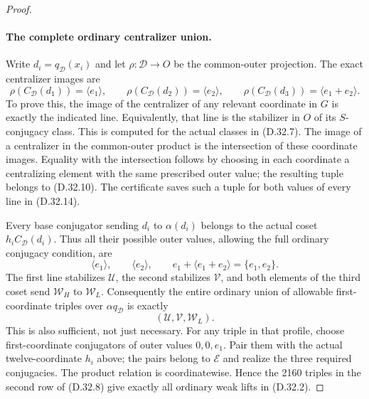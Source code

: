 \begin{proof}
\paragraph{The complete ordinary centralizer union.}
Write $d_i=q_{\mathcal D}(x_i)$
and let $\rho:\mathcal D\to O$
be the common-outer projection.
The exact centralizer images are
\[
 \rho(C_{\mathcal D}(d_1))=\langle e_1\rangle,\qquad
 \rho(C_{\mathcal D}(d_2))=\langle e_2\rangle,\qquad
 \rho(C_{\mathcal D}(d_3))=\langle e_1+e_2\rangle.
 \tag{D.32.14}
\]
To prove this, the image of
the centralizer of any relevant
coordinate in $G$ is exactly
the indicated line.  Equivalently,
that line is the stabilizer in
$O$ of its $S$-conjugacy class.
This is computed for the actual
classes in \textup{(D.32.7)}.
The image of a centralizer
in the common-outer product
is the intersection of these
coordinate images.  Equality
with the intersection follows
by choosing in each coordinate
a centralizing element with
the same prescribed outer value;
the resulting tuple belongs
to \textup{(D.32.10)}.
The certificate saves such
a tuple for both values of
every line in
\textup{(D.32.14)}.

Every base conjugator sending
$d_i$ to $\alpha(d_i)$ belongs
to the actual coset
$h_iC_{\mathcal D}(d_i)$.
Thus all their possible outer
values, allowing the full
ordinary conjugacy condition,
are
\[
 \langle e_1\rangle,\qquad
 \langle e_2\rangle,\qquad
 e_1+\langle e_1+e_2\rangle
                       =\{e_1,e_2\}.
 \tag{D.32.15}
\]
The first line stabilizes
$\mathcal U$, the second
stabilizes $\mathcal V$, and
both elements of the third
coset send $\mathcal W_H$
to $\mathcal W_L$.
Consequently the entire
ordinary union of allowable
first-coordinate triples over
$\alpha q_{\mathcal D}$ is
exactly
\[
                   (\mathcal U,\mathcal V,\mathcal W_L).
 \tag{D.32.16}
\]
This is also sufficient,
not just necessary.
For any triple in that profile,
choose first-coordinate
conjugators of outer values
$0,0,e_1$.  Pair them with
the actual twelve-coordinate
$h_i$ above; the pairs belong
to $\mathcal E$ and realize
the three required conjugacies.
The product relation is
coordinatewise.  Hence the
2160 triples in the second
row of \textup{(D.32.8)}
give exactly all ordinary
weak lifts in
\textup{(D.32.2)}.


\end{proof}
